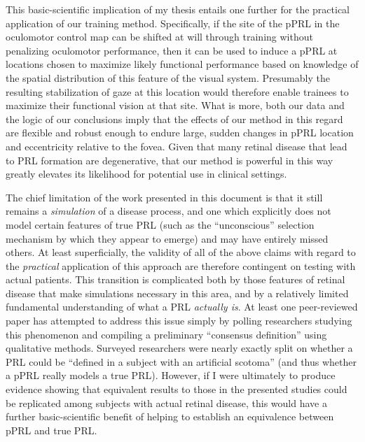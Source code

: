 This basic-scientific implication of my thesis entails one further for the practical application of our training method. Specifically, if the site of the pPRL in the oculomotor control map can be shifted at will through training without penalizing oculomotor performance, then it can be used to induce a pPRL at locations chosen to maximize likely functional performance based on knowledge of the spatial distribution of this feature of the visual system. Presumably the resulting stabilization of gaze at this location would therefore enable trainees to maximize their functional vision at that site. What is more, both our data and the logic of our conclusions imply that the effects of our method in this regard are flexible and robust enough to endure large, sudden changes in pPRL location and eccentricity relative to the fovea. Given that many retinal disease that lead to PRL formation are degenerative, that our method is powerful in this way greatly elevates its likelihood for potential use in clinical settings. 

The chief limitation of the work presented in this document is that it still remains a \textit{simulation} of a disease process, and one which explicitly does not model certain features of true PRL (such as the ``unconscious'' selection mechanism by which they appear to emerge) and may have entirely missed others. At least superficially, the validity of all of the above claims with regard to the \textit{practical} application of this approach are therefore contingent on testing with actual patients. This transition is complicated both by those features of retinal disease that make simulations necessary in this area, and by a relatively limited fundamental understanding of what a PRL \textit{actually is}. At least one peer-reviewed paper \cite{crossland_2011} has attempted to address this issue simply by polling researchers studying this phenomenon and compiling a preliminary ``consensus definition'' using qualitative methods. Surveyed researchers were nearly exactly split on whether a PRL could be ``defined in a subject with an artificial scotoma'' (and thus whether a pPRL really models a true PRL). However, if I were ultimately to produce evidence showing that equivalent results to those in the presented studies could be replicated among subjects with actual retinal disease, this would have a further basic-scientific benefit of helping to establish an equivalence between pPRL and true PRL.

